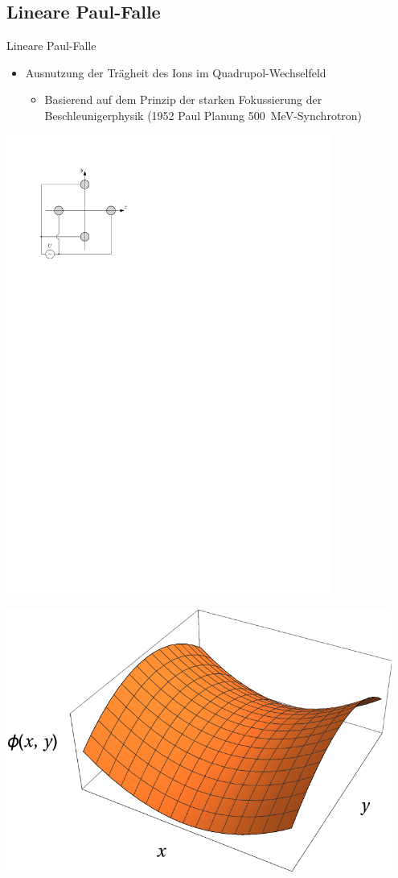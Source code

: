 \documentclass[12pt,xcolor=dvipsnames]{beamer}
\begin{document}
\subsection{Lineare Paul-Falle}
\begin{frame}{Lineare Paul-Falle}
	\begin{itemize}
		\item Ausnutzung der Trägheit des Ions im Quadrupol-Wechselfeld
		\begin{itemize}
			\item Basierend auf dem Prinzip der starken Fokussierung der Beschleunigerphysik (1952 Paul Planung \SI{500}{MeV}-Synchrotron)
		\end{itemize}
	\end{itemize}
	
	
	\begin{minipage}[t]{0.5\textwidth}
		\centering
		\includegraphics[width=0.8\textwidth]{./figures/lineare_paulfalle_xy.pdf}
	\end{minipage}%
	\begin{minipage}[t]{0.5\textwidth}
		\centering
		\includegraphics[width=0.95\textwidth]{./figures/sattelpotential.pdf}

\end{minipage}
\end{frame}
\end{document}
